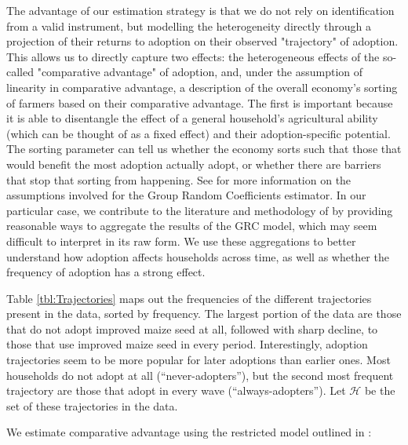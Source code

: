 \documentclass{article}
\begin{document}
The advantage of our estimation strategy is that we do not rely on identification from a valid instrument, but modelling the heterogeneity directly through a projection of their returns to adoption on their observed "trajectory" of adoption. This allows us to directly capture two effects: the heterogeneous effects of the so-called "comparative advantage" of adoption, and, under the assumption of linearity in comparative advantage, a description of the overall economy's sorting of farmers based on their comparative advantage. The first is important because it is able to disentangle the effect of a general household's agricultural ability (which can be thought of as a fixed effect) and their adoption-specific potential. The sorting parameter can tell us whether the economy sorts such that those that would benefit the most adoption actually adopt, or whether there are barriers that stop that sorting from happening. See \cite{Tjernstrom_Emilia_Dalia_Ghanem_Oscar_Barriga_Cabanillas_Travis_J_Lybbert_Jeffrey_D_Michler_and_Aleksandr_Michuda2020-bc} for more information on the assumptions involved for the Group Random Coefficients estimator. In our particular case, we contribute to the literature and methodology of \cite{Tjernstrom_Emilia_Dalia_Ghanem_Oscar_Barriga_Cabanillas_Travis_J_Lybbert_Jeffrey_D_Michler_and_Aleksandr_Michuda2020-bc} by providing reasonable ways to aggregate the results of the GRC model, which may seem difficult to interpret in its raw form. We use these aggregations to better understand how adoption affects households across time, as well as whether the frequency of adoption has a strong effect.



Table \ref{tbl:Trajectories} maps out the frequencies of the different trajectories present in the data, sorted by frequency. The largest portion of the data are those that do not adopt improved maize seed at all, followed with sharp decline, to those that use improved maize seed in every period. Interestingly, adoption trajectories seem to be more popular for later adoptions than earlier ones. Most households do not adopt at all (``never-adopters''), but the second most frequent trajectory are those that adopt in every wave (``always-adopters''). Let $\mathcal{H}$ be the set of these trajectories in the data.


We estimate comparative advantage using the restricted model outlined in \cite{Tjernstrom_Emilia_Dalia_Ghanem_Oscar_Barriga_Cabanillas_Travis_J_Lybbert_Jeffrey_D_Michler_and_Aleksandr_Michuda2020-bc}:
\end{document}
